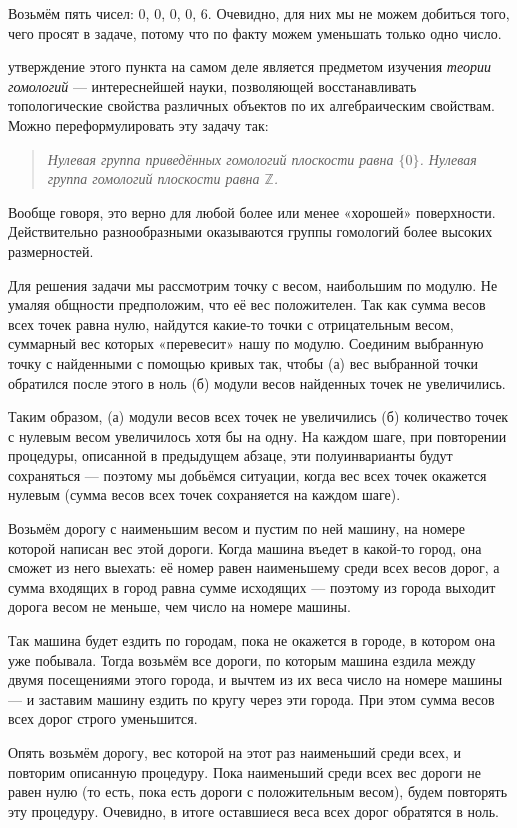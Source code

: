 \begin{itemize}
\itA Возьмём пять чисел: 0, 0, 0, 0, 6. Очевидно, для них мы не можем добиться того, чего просят в задаче, потому что по факту можем уменьшать только одно число.

 утверждение этого пункта на самом деле является предметом изучения {\itshape теории гомологий} — интереснейшей науки, позволяющей восстанавливать топологические свойства различных объектов по их алгебраическим свойствам. Можно переформулировать эту задачу так:

\begin{quote} \itshape
	Нулевая группа приведённых гомологий плоскости равна $\{0\}$. Нулевая группа гомологий плоскости равна $\mathbb Z$.
\end{quote}

Вообще говоря, это верно для любой более или менее «хорошей» поверхности. Действительно разнообразными оказываются группы гомологий более высоких размерностей.

Для решения задачи мы рассмотрим точку с весом, наибольшим по модулю. Не умаляя общности предположим, что её вес положителен. Так как сумма весов всех точек равна нулю, найдутся какие-то точки с отрицательным весом, суммарный вес которых «перевесит» нашу по модулю. Соединим выбранную точку с найденными с помощью кривых так, чтобы (а) вес выбранной точки обратился после этого в ноль (б) модули весов найденных точек не увеличились.

Таким образом, (а) модули весов всех точек не увеличились (б) количество точек с нулевым весом увеличилось хотя бы на одну. На каждом шаге, при повторении процедуры, описанной в предыдущем абзаце, эти полуинварианты будут сохраняться — поэтому мы добьёмся ситуации, когда вес всех точек окажется нулевым (сумма весов всех точек сохраняется на каждом шаге).

\itC Возьмём дорогу с наименьшим весом и пустим по ней машину, на номере которой написан вес этой дороги. Когда машина въедет в какой-то город, она сможет из него выехать: её номер равен наименьшему среди всех весов дорог, а сумма входящих в город равна сумме исходящих — поэтому из города выходит дорога весом не меньше, чем число на номере машины.

Так машина будет ездить по городам, пока не окажется в городе, в котором она уже побывала. Тогда возьмём все дороги, по которым машина ездила между двумя посещениями этого города, и вычтем из их веса число на номере машины — и заставим машину ездить по кругу через эти города. При этом сумма весов всех дорог строго уменьшится.

Опять возьмём дорогу, вес которой на этот раз наименьший среди всех, и повторим описанную процедуру. Пока наименьший среди всех вес дороги не равен нулю (то есть, пока есть дороги с положительным весом), будем повторять эту процедуру. Очевидно, в итоге оставшиеся веса всех дорог обратятся в ноль.
\end{itemize}
